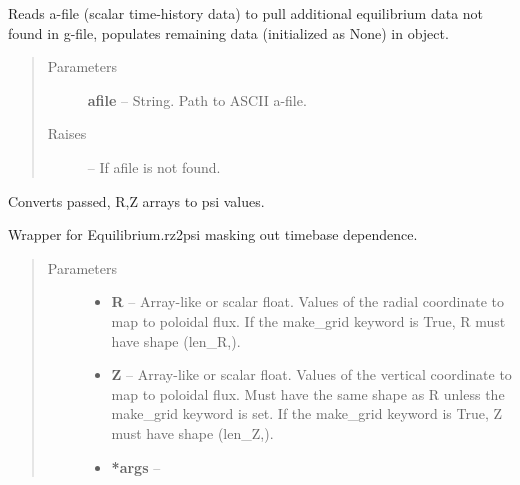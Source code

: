 \documentclass[letterpaper,10pt,english]{sphinxmanual}
\begin{document}
\begin{fulllineitems}
\begin{fulllineitems}
\end{fulllineitems}


\begin{fulllineitems}
\label{eqtools:eqtools.eqdskreader.EqdskReader.readAFile}
Reads a-file (scalar time-history data) to pull additional equilibrium data
not found in g-file, populates remaining data (initialized as None) in object.
\begin{quote}\begin{description}
\item[{Parameters }] \leavevmode
\textbf{afile} --
String.
Path to ASCII a-file.

\item[{Raises }] \leavevmode
{} -- 
If afile is not found.

\end{description}\end{quote}

\end{fulllineitems}


\begin{fulllineitems}
\label{eqtools:eqtools.eqdskreader.EqdskReader.rz2psi}
Converts passed, R,Z arrays to psi values.

Wrapper for Equilibrium.rz2psi masking out timebase dependence.
\begin{quote}\begin{description}
\item[{Parameters }] \leavevmode\begin{itemize}
\item {} 
\textbf{R} --
Array-like or scalar float.
Values of the radial coordinate to
map to poloidal flux. If the make\_grid keyword is True, R must
have shape (len\_R,).

\item {} 
\textbf{Z} --
Array-like or scalar float.
Values of the vertical coordinate to
map to poloidal flux. Must have the same shape as R unless the
make\_grid keyword is set. If the make\_grid keyword is True, Z
must have shape (len\_Z,).

\item {} 
\textbf{*args} --


\end{itemize}
\end{description}
\end{quote}
\end{fulllineitems}
\end{fulllineitems}
\end{document}
